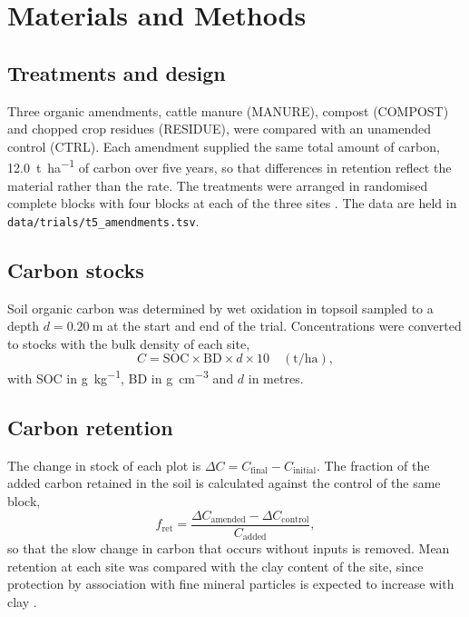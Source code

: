 \section{Materials and Methods}

\subsection{Treatments and design}
Three organic amendments, cattle manure (MANURE), compost (COMPOST) and
chopped crop residues (RESIDUE), were compared with an unamended control
(CTRL). Each amendment supplied the same total amount of carbon,
\SI{12.0}{\tonne\per\hectare} of carbon over five years, so that differences in
retention reflect the material rather than the rate. The treatments were
arranged in randomised complete blocks with four blocks at each of the three
sites \parencite{gomez1984}. The data are held in
\texttt{data/trials/t5\_amendments.tsv}.

\subsection{Carbon stocks}
Soil organic carbon was determined by wet oxidation in topsoil sampled to a
depth $d = \SI{0.20}{\metre}$ at the start and end of the trial. Concentrations
were converted to stocks with the bulk density of each site,
\begin{equation}
  C = \mathrm{SOC}\times \mathrm{BD}\times d \times 10
  \quad (\si{\tonne\per\hectare}),
  \label{eq:stock}
\end{equation}
with SOC in \si{\gram\per\kilo\gram}, BD in \si{\gram\per\centi\metre\cubed}
and $d$ in metres.

\subsection{Carbon retention}
The change in stock of each plot is
$\Delta C = C_{\mathrm{final}} - C_{\mathrm{initial}}$. The fraction of the
added carbon retained in the soil is calculated against the control of the same
block,
\begin{equation}
  f_{\mathrm{ret}} = \frac{\Delta C_{\mathrm{amended}} - \Delta C_{\mathrm{control}}}{C_{\mathrm{added}}},
  \label{eq:retention}
\end{equation}
so that the slow change in carbon that occurs without inputs is removed. Mean
retention at each site was compared with the clay content of the site, since
protection by association with fine mineral particles is expected to increase
with clay \parencite{six2002,vonlutzow2006}.
